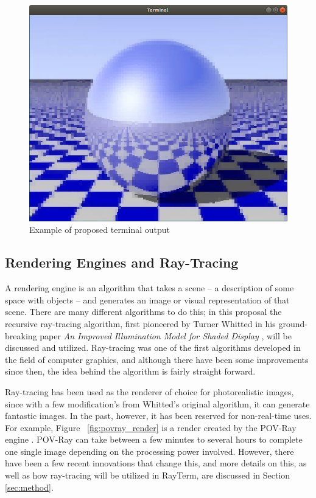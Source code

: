\documentclass[11pt]{article}
\newcommand{\name}{{\sc RayTerm}}
\begin{document}
\begin{figure}[htb]
  \centering
  \includegraphics[width=\textwidth]{resources/checker_metal}
  \caption{Example of proposed terminal output}
  \label{fig:checker_metal}
\end{figure}

\subsection{Rendering Engines and Ray-Tracing}
\label{sec:introduction:raytracing}

A rendering engine is an algorithm that takes a scene -- a description of some space with objects -- and generates an image or visual representation of that scene.
There are many different algorithms to do this; in this proposal the recursive ray-tracing algorithm, first pioneered by Turner Whitted in his ground-breaking paper {\it An Improved Illumination Model for Shaded Display} \cite{whitted1980improved}, will be discussed and utilized.
Ray-tracing was one of the first algorithms developed in the field of computer graphics, and although there have been some improvements since then, the idea behind the algorithm is fairly straight forward.

Ray-tracing has been used as the renderer of choice for photorealistic images, since with a few modification's from Whitted's original algorithm, it can generate fantastic images.
In the past, however, it has been reserved for non-real-time uses.
For example, Figure ~\ref{fig:povray_render} is a render created by the POV-Ray engine \cite{povray}.
POV-Ray can take between a few minutes to several hours to complete one single image depending on the processing power involved.
However, there have been a few recent innovations that change this, and more details on this, as well as how ray-tracing will be utilized in \name, are discussed in Section \ref{sec:method}.
\end{document}
